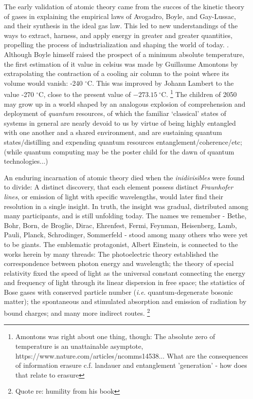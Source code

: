 	The early validation of atomic theory came from the succes of the kinetic theory of gases in explaining the empirical laws of Avogadro, Boyle, and Gay-Lussac, and their synthesis in the ideal gas law. This led to new understandings of the ways to extract, harness, and apply energy in greater and greater quantities, propelling the process of industrialization and shaping the world of today. . Although Boyle himself raised the prospect of a minimum absolute temperature, the first estimation of it value in celsius was made by Guillaume Amontons by extrapolating the contraction of a cooling air column to the point where its volume would vanish: -240 $^\circ$C. This was improved by Johann Lambert to the value -270 $^\circ$C, close to the present value of $-273.15~^\circ$C. \footnote{Amontons was right about one thing, though: The absolute zero of temperature is an unattainable asymptote, https://www.nature.com/articles/ncomms14538... What are the consequences of information erasure c.f. landauer and entanglement 'generation' - how does that relate to erasure}
	The children of 2050 may grow up in a world shaped by an analogous explosion of comprehension and deployment of \emph{quantum} resources, of which the familiar `classical' states of systems in general are nearly devoid to us by virtue of being highly entangled with one another and a shared environment, and are sustaining quantum states/distilling and expending quantum resources entanglement/coherence/etc; (while quantum computing may be the poster child for the dawn of quantum technologies...)

	An enduring incarnation of atomic theory died when the \emph{inidivisibles} were found to divide:
	A distinct discovery, that each element possess distinct \emph{Fraunhofer lines}, or emission of light with specific wavelengths, would later find their resolution in a single insight.
	In truth, the insight was gradual, distributed among many participants, and is still unfolding today. The names we remember - Bethe, Bohr, Born, de Broglie, Dirac, Ehrenfest, Fermi, Feynman, Heisenberg, Lamb, Pauli, Planck, Schrodinger, Sommerfeld - stood among many others who were yet to be giants. The emblematic protagonist, Albert Einstein, is connected to the works herein by many threads: The photoelectric theory established the correspondence between photon energy and wavelength; the theory of special relativity fixed the speed of light as the universal constant connecting the energy and frequency of light through its linear dispersion in free space; the statistics of Bose gases with conserved particle number (\emph{i.e.} quantum-degenerate bosonic matter); the spontaneous and stimulated absorption and emission of radiation by bound charges; and many more indirect routes. \footnote{Quote re: humility from his book}


